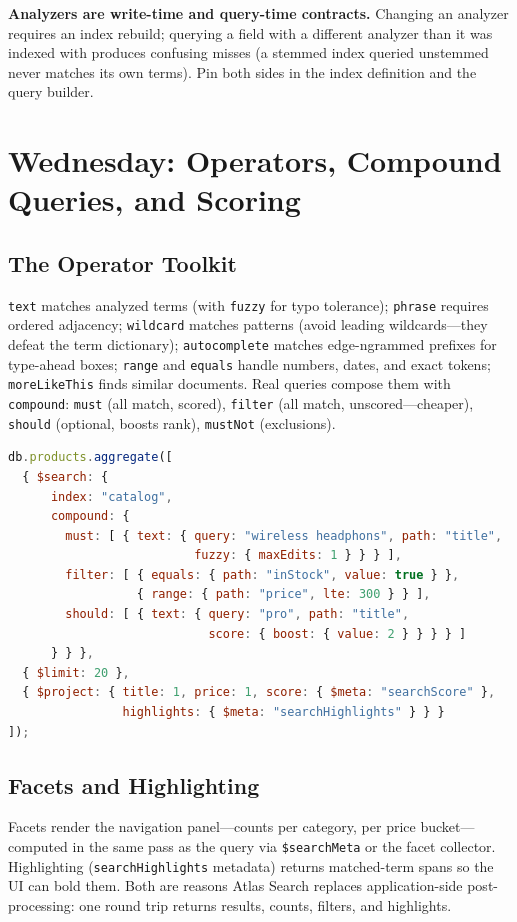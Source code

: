 \begin{pitfall}
\textbf{Analyzers are write-time and query-time contracts.} Changing an analyzer requires an index rebuild; querying a field with a different analyzer than it was indexed with produces confusing misses (a stemmed index queried unstemmed never matches its own terms). Pin both sides in the index definition and the query builder.
\end{pitfall}

\section{Wednesday: Operators, Compound Queries, and Scoring}
\subsection{The Operator Toolkit}
\texttt{text} matches analyzed terms (with \texttt{fuzzy} for typo tolerance); \texttt{phrase} requires ordered adjacency; \texttt{wildcard} matches patterns (avoid leading wildcards---they defeat the term dictionary); \texttt{autocomplete} matches edge-ngrammed prefixes for type-ahead boxes; \texttt{range} and \texttt{equals} handle numbers, dates, and exact tokens; \texttt{moreLikeThis} finds similar documents. Real queries compose them with \texttt{compound}: \texttt{must} (all match, scored), \texttt{filter} (all match, unscored---cheaper), \texttt{should} (optional, boosts rank), \texttt{mustNot} (exclusions).

\begin{lstlisting}[language=JavaScript, caption={Compound search: filtered, boosted, typo-tolerant.}]
db.products.aggregate([
  { $search: {
      index: "catalog",
      compound: {
        must: [ { text: { query: "wireless headphons", path: "title",
                          fuzzy: { maxEdits: 1 } } } ],
        filter: [ { equals: { path: "inStock", value: true } },
                  { range: { path: "price", lte: 300 } } ],
        should: [ { text: { query: "pro", path: "title",
                            score: { boost: { value: 2 } } } } ]
      } } },
  { $limit: 20 },
  { $project: { title: 1, price: 1, score: { $meta: "searchScore" },
                highlights: { $meta: "searchHighlights" } } }
]);
\end{lstlisting}

\subsection{Facets and Highlighting}
Facets render the navigation panel---counts per category, per price bucket---computed in the same pass as the query via \texttt{\$searchMeta} or the facet collector. Highlighting (\texttt{searchHighlights} metadata) returns matched-term spans so the UI can bold them. Both are reasons Atlas Search replaces application-side post-processing: one round trip returns results, counts, filters, and highlights.

